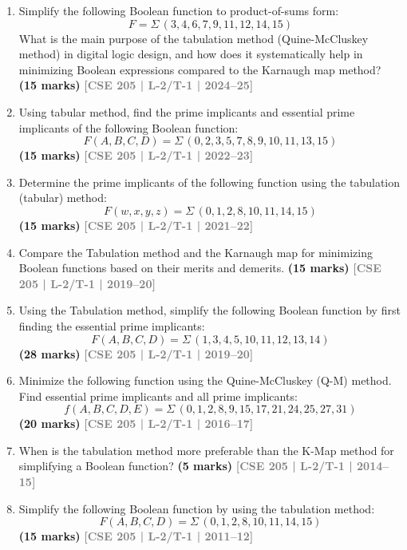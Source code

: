 \documentclass[12pt]{article}
\newcommand{\yr}[1]{\hfill\textcolor{gray}{\small\textbf{[#1]}}}
\newcommand{\mk}[1]{\textcolor{orange!70!black}{\small\textbf{(#1 marks)}}}
\begin{document}
\begin{enumerate}


\item Simplify the following Boolean function to product-of-sums form:
\[ F = \Sigma\,(3,4,6,7,9,11,12,14,15) \]
What is the main purpose of the tabulation method (Quine-McCluskey method) in digital logic design, and how does it systematically help in minimizing Boolean expressions compared to the Karnaugh map method?
\mk{15} \yr{CSE 205 | L-2/T-1 | 2024--25}



\item Using tabular method, find the prime implicants and essential prime implicants of the following Boolean function:
\[ F(A, B, C, D) = \Sigma\,(0, 2, 3, 5, 7, 8, 9, 10, 11, 13, 15) \]
\mk{15} \yr{CSE 205 | L-2/T-1 | 2022--23}




\item Determine the prime implicants of the following function using the tabulation (tabular) method:
\[ F(w, x, y, z) = \Sigma\,(0, 1, 2, 8, 10, 11, 14, 15) \]
\mk{15} \yr{CSE 205 | L-2/T-1 | 2021--22}



\item Compare the Tabulation method and the Karnaugh map for minimizing Boolean functions based on their merits and demerits.
\mk{15} \yr{CSE 205 | L-2/T-1 | 2019--20}



\item Using the Tabulation method, simplify the following Boolean function by first finding the essential prime implicants:
\[ F(A,B,C,D) = \Sigma\,(1,3,4,5,10,11,12,13,14) \]
\mk{28} \yr{CSE 205 | L-2/T-1 | 2019--20}



\item Minimize the following function using the Quine-McCluskey (Q-M) method. Find essential prime implicants and all prime implicants:
\[ f(A,B,C,D,E) = \Sigma\,(0,1,2,8,9,15,17,21,24,25,27,31) \]
\mk{20} \yr{CSE 205 | L-2/T-1 | 2016--17}



\item When is the tabulation method more preferable than the K-Map method for simplifying a Boolean function?
\mk{5} \yr{CSE 205 | L-2/T-1 | 2014--15}



\item Simplify the following Boolean function by using the tabulation method:
\[ F(A,B,C,D) = \Sigma\,(0,1,2,8,10,11,14,15) \]
\mk{15} \yr{CSE 205 | L-2/T-1 | 2011--12}



\end{enumerate}
\end{document}
